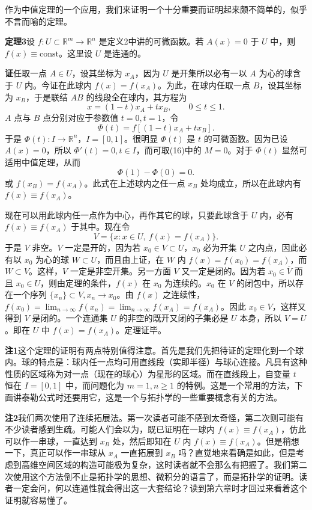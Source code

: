 作为中值定理的一个应用，我们来证明一个十分重要而证明起来颇不简单的，似乎不言而喻的定理。

\noindent\textbf{定理3}\quad 设 $f:U\subset\mathbb R^m\to\mathbb R^n$ 是定义2中讲的可微函数。若 $A(x)=0$ 于 $U$ 中，则 $f(x)\equiv\mathrm{const}$。这里设 $U$ 是连通的。

\noindent\textbf{证}\quad 任取一点 $A\in U$，设其坐标为 $x_A$，因为 $U$ 是开集所以必有一以 $A$ 为心的球含于 $U$ 内。今证在此球内 $f(x)=f(x_A)$。为此，在球内任取一点 $B$，设其坐标为 $x_B$，于是联结 $AB$ 的线段全在球内，其方程为
\[
 x=(1-t)x_A+tx_B,\qquad 0\le t\le1.
\]
$A$ 点与 $B$ 点分别对应于参数值 $t=0,t=1$，令
\[
 \Phi(t)=f[(1-t)x_A+tx_B].
\]
于是 $\Phi(t):I\to\mathbb R^n$，$I=[0,1]$。很明显 $\Phi(t)$ 是 $t$ 的可微函数。因为已设 $A(x)=0$，所以 $\Phi'(t)=0,t\in I$，而可取(16)中的 $M=0$。对于 $\Phi(t)$ 显然可适用中值定理，从而
\[
 \Phi(1)-\Phi(0)=0.
\]
或 $f(x_B)=f(x_A)$。此式在上述球内之任一点 $x_B$ 处均成立，所以在此球内有 $f(x)\equiv f(x_A)$。

现在可以用此球内任一点作为中心，再作其它的球，只要此球含于 $U$ 内，必有 $f(x)\equiv f(x_A)$ 于其中。现在令
\[
 V=\{x:x\in U,\ f(x)=f(x_A)\}.
\]
于是 $V$ 非空。$V$ 一定是开的，因为若 $x_0\in V\subset U$，$x_0$ 必为开集 $U$ 之内点，因此必有以 $x_0$ 为心的球 $W\subset U$，而且由上证，在 $W$ 内 $f(x)=f(x_0)=f(x_A)$，而 $W\subset V$。这样，$V$ 一定是非空开集。另一方面 $V$ 又一定是闭的。因为若 $x_0\in\overline V$ 而且 $x_0\in U$，则由定理的条件，$f(x)$ 在 $x_0$ 为连续的。$x_0$ 在 $V$ 的闭包中，所以存在一个序列 $\{x_n\}\subset V,x_n\to x_0$。由 $f(x)$ 之连续性，$f(x_0)=\lim_{n\to\infty}f(x_n)=\lim_{n\to\infty}f(x_A)=f(x_A)$。因此 $x_0\in V$，这样又得到 $V$ 是闭的。一个连通集 $U$ 的非空的既开又闭的子集必是 $U$ 本身，所以 $V=U$。即在 $U$ 中 $f(x)=f(x_A)$。定理证毕。

\noindent\textbf{注1}\quad 这个定理的证明有两点特别值得注意。首先是我们先把待证的定理化到一个球内。球的特点是：球内任一点均可用直线段（实即半径）与球心连接。凡具有这种性质的区域称为对一点（现在的球心）为星形的区域。而在直线段上，自变量 $t$ 恒在 $I=[0,1]$ 中，而问题化为 $m=1,n\ge1$ 的特例。这是一个常用的方法，下面讲泰勒公式时还要用它，这是一个与拓扑学的一些重要概念有关的方法。

\noindent\textbf{注2}\quad 我们两次使用了连续拓展法。第一次读者可能不感到太奇怪，第二次则可能有不少读者感到生疏。可能人们会以为，既已证明在一球内 $f(x)\equiv f(x_A)$，仿此可以作一串球，一直达到 $x_B$ 处，然后即知在 $U$ 内 $f(x)\equiv f(x_A)$。但是稍想一下，真正可以作一串球从 $x_A$ 一直拓展到 $x_B$ 吗？直觉地来看确是如此，但是考虑到高维空间区域的构造可能极为复杂，这时读者就不会那么有把握了。我们第二次使用这个方法倒不止是拓扑学的思想、微积分的语言了，而是拓扑学的证明。读者一定会问，何以连通性就会得出这一大套结论？读到第六章时才回过来看着这个证明就容易懂了。

